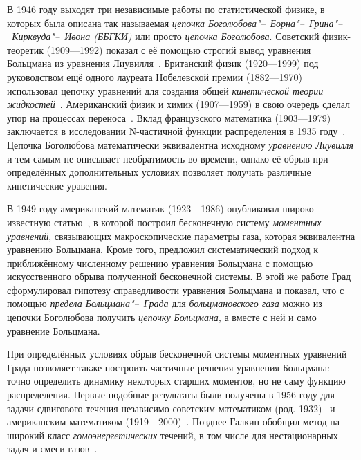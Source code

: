 \documentclass[a4paper, 12pt, oneside]{article} %
\begin{document}
В 1946 году выходят три независимые работы по статистической физике, в
которых была описана так называемая \emph{цепочка
Боголюбова"--~Борна"--~Грина"--~Кирквуда"--~Ивона (ББГКИ)} или просто
\emph{цепочка Боголюбова}. Советский физик-теоретик  (1909---1992) показал с её помощью строгий вывод уравнения
Больцмана из уравнения Лиувилля~\cite{bogolyubov1946kinetic}. Британский
физик  (1920---1999) под руководством ещё одного
лауреата Нобелевской премии  (1882---1970)
использовал цепочку уравнений для создания общей \emph{кинетической
теории жидкостей}~\cite{born1946general}. Американский физик и химик
 (1907---1959) в свою очередь сделал упор на
процессах переноса~\cite{kirkwood1946statistical}. Вклад французского
математика  (1903---1979) заключается в исследовании
N-частичной функции распределения в 1935 году~\cite{yvon1935theorie}.
Цепочка Боголюбова математически эквивалентна исходному \emph{уравнению
Лиувилля} и тем самым не описывает необратимость во времени, однако её
обрыв при определённых дополнительных условиях позволяет получать
различные кинетические уравения. 

В 1949 году американский математик  (1923---1986)
опубликовал широко известную статью~\cite{grad1949kinetic}, в которой
построил бесконечную систему \emph{моментных уравнений}, связывающих
макроскопические параметры газа, которая эквивалентна уравнению
Больцмана. Кроме того, предложил систематический подход к приближённому
численному решению уравнения Больцмана с помощью искусственного обрыва
полученной бесконечной системы. В этой же работе Град сформулировал
гипотезу справедливости уравнения Больцмана и показал, что с помощью
\emph{предела Больцмана"--~Града} для \emph{больцмановского газа} можно
из цепочки Боголюбова получить \emph{цепочку Больцмана}, а вместе с ней
и само уравнение Больцмана.

При определённых условиях обрыв бесконечной системы моментных уравнений
Града позволяет также построить частичные решения уравнения Больцмана:
точно определить динамику некоторых старших моментов, но не саму функцию
распределения. Первые подобные результаты были получены в 1956 году для задачи
сдвигового течения независимо советским математиком  (род. 1932)~\cite{galkin1956solution} и американским
математиком 
(1919---2000)~\cite{truesdell1956pressures}. Позднее Галкин обобщил
метод на широкий класс \emph{гомоэнергетических} течений, в том числе
для нестационарных задач и смеси газов~\cite{galkin1956solutions}.
\end{document}
